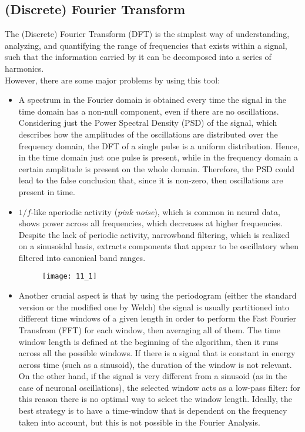 \subsection{(Discrete) Fourier Transform}
The (Discrete) Fourier Transform (DFT) is the simplest way of understanding, analyzing, and
quantifying the range of frequencies that exists within a signal, such that the information
carried by it can be decomposed into a series of harmonics.\\
However, there are some major problems by using this tool:
\begin{itemize}
    \item A spectrum in the Fourier domain is obtained every time the signal in the time domain
          has a non-null component, even if there are no oscillations. Considering just the Power
          Spectral Density (PSD) of the signal, which describes how the amplitudes of the
          oscillations are distributed over the frequency domain, the DFT of a single pulse is a
          uniform distribution. Hence, in the time domain just one pulse is present, while in the
          frequency domain a certain amplitude is present on the whole domain. Therefore, the PSD
          could lead to the false conclusion that, since it is non-zero, then oscillations are
          present in time.
    \item \(1/f\)-like aperiodic activity (\textit{pink noise}), which is common in neural data,
          shows power across all frequencies, which decreases at higher frequencies. Despite the lack
          of periodic activity, narrowband filtering, which is realized on a sinusoidal basis, extracts
          components that appear to be oscillatory when filtered into canonical band ranges.
          \begin{figure}[H]
              \texttt{[image: 11\_1]}
              \centering
          \end{figure}
    \item Another crucial aspect is that by using the periodogram (either the standard version
          or the modified one by Welch) the signal is usually partitioned into different time windows of a
          given length in order to perform the Fast Fourier Transfrom (FFT) for each window, then averaging
          all of them. The time window length is defined at the beginning of the algorithm, then it runs across
          all the possible windows. If there is a signal that is constant in energy across time (such as a sinusoid),
          the duration of the window is not relevant. On the other hand, if the signal is very different from
          a sinusoid (as in the case of neuronal oscillations), the selected window acts as a low-pass filter:
          for this reason there is no optimal way to select the window length. Ideally, the best strategy
          is to have a time-window that is dependent on the frequency taken into account, but this is not possible
          in the Fourier Analysis.
\end{itemize}

